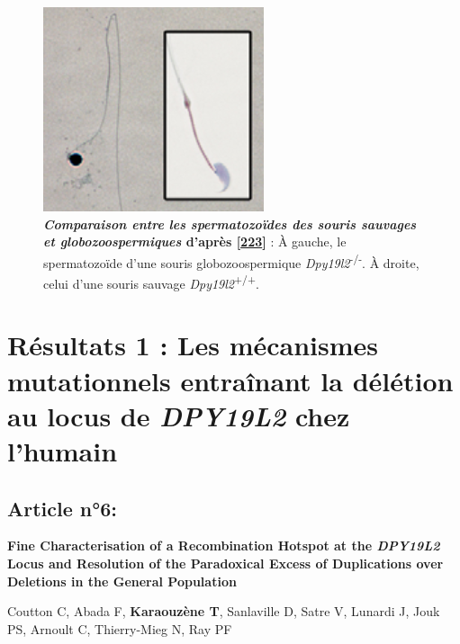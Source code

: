 \documentclass[12pt,a4paper,twoside]{ugathesis}
\theoremstyle{definition}
\theoremstyle{definition}
\theoremstyle{definition}
\theoremstyle{remark}
\begin{document}
\begin{figure}

{\centering \includegraphics[scale=.9]{figure/mouse_globo_spz} 

}

\caption[Comparaison entre les spermatozoïdes des
souris sauvages et globozoospermiques]{\textbf{\emph{Comparaison entre les spermatozoïdes
des souris sauvages et globozoospermiques} d'après
{[}\protect\hyperlink{ref-Pierre2012}{223}{]}} : À gauche, le
spermatozoïde d'une souris globozoospermique
\emph{Dpy19l2}\textsuperscript{-/-}. À droite, celui d'une souris
sauvage \emph{Dpy19l2}\textsuperscript{+/+}.\\}\label{fig:pictmouseglobo}
\end{figure}










\newpage

\section{\texorpdfstring{Résultats 1 : Les mécanismes mutationnels
entraînant la délétion au locus de \emph{DPY19L2} chez
l'humain}{Résultats 1 : Les mécanismes mutationnels entraînant la délétion au locus de DPY19L2 chez l'humain}}\label{mecamut}

\subsection{Article n°6:}\label{article-n6}

\textbf{Fine Characterisation of a Recombination Hotspot at the
\emph{DPY19L2} Locus and Resolution of the Paradoxical Excess of
Duplications over Deletions in the General Population}

Coutton C, Abada F, \textbf{Karaouzène T}, Sanlaville D, Satre V,
Lunardi J, Jouk PS, Arnoult C, Thierry-Mieg N, Ray PF
\end{document}
